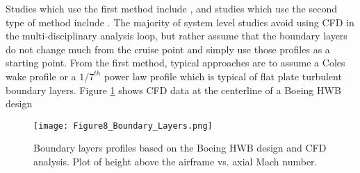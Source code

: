 			Studies which use the first method include \cite{Sato2011} \cite{Plas2007}, and studies which use the second type of method include  \cite{Felder2011} \cite{Hardin2012} \cite{Kawai2006}.  The majority of system level studies avoid using CFD in the multi-disciplinary analysis loop, but rather assume that the boundary layers do not change much from the cruise point and simply use those profiles as a starting point.  From the first method, typical approaches are to assume a Coles wake profile or a $1/7^{th}$ power law profile which is typical of flat plate turbulent boundary layers.  Figure \ref{Boundary_Layer_Profiles} shows CFD data at the centerline of a Boeing HWB design \cite{Felder2011}
			\begin{figure}
				\centering
				\texttt{[image: Figure8\_Boundary\_Layers.png]}
				\caption{Boundary layers profiles based on the Boeing HWB design and CFD analysis.  Plot of height above the airframe vs. axial Mach number. \cite{Fedler2011}}
				\label{Boundary_Layer_Profiles}
			\end{figure}
